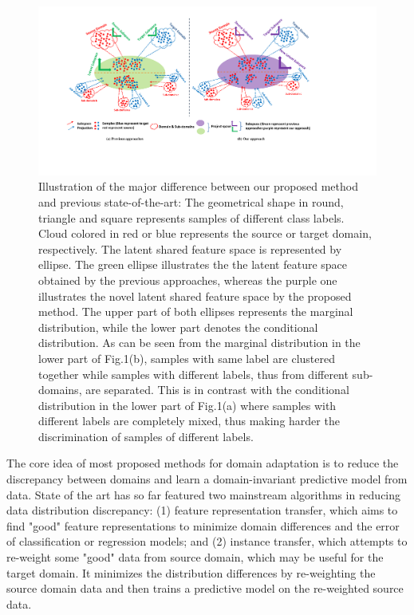 \documentclass[10pt,twocolumn,letterpaper]{article}
\begin{document}
\begin{CJK*}{UTF8}{gkai}
\begin{figure}[h!]
	\centering
	\label{fig:diff}
	\includegraphics[width=1\linewidth]{iccv.pdf}
	\vspace{-7pt}
	\caption {  Illustration of the major difference between our proposed method and previous state-of-the-art: The geometrical shape in round, triangle and square represents samples of  different class labels. Cloud colored in red or blue represents the source or target domain, respectively. The latent shared feature space is represented by ellipse.  The green ellipse illustrates the the latent feature space obtained by the previous approaches, whereas the purple one illustrates the novel latent shared feature space by the proposed method. The upper part of both ellipses represents the marginal distribution,  while the lower part denotes the conditional distribution. As can be seen from the marginal distribution in the lower part of Fig.1(b), samples with same label are clustered together  while samples with different labels, thus from different sub-domains, are separated. This is in contrast with the conditional distribution in the lower part of Fig.1(a) where samples with different labels are completely mixed, thus making harder the discrimination of samples of different labels.} 
\end{figure} 


The core idea of most proposed methods for domain adaptation is to reduce the discrepancy between domains and learn a domain-invariant predictive model from data. State of the art has so far featured two  mainstream algorithms in reducing data distribution discrepancy: (1) feature representation transfer, which aims to find "good" feature representations to minimize domain differences and the error of classification or regression models;  and (2) instance transfer, which attempts to re-weight some "good" data from source domain, which may be useful for the target domain.  It minimizes the distribution differences by re-weighting the source domain data and then trains a predictive model on the re-weighted source data. 


\end{CJK*}
\end{document}

